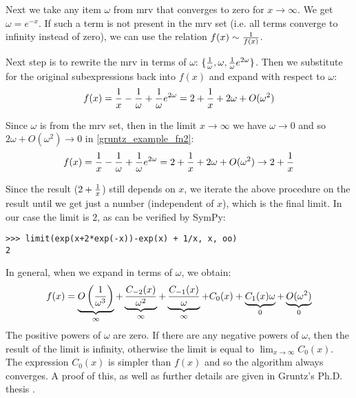 Next we take any item $\omega$ from mrv that converges to zero for
$x\to\infty$.  We get $\omega=e^{-x}$. If such a term is not present in the mrv
set (i.e. all terms converge to infinity instead of zero), we can use the
relation $f(x)\sim {1\over f(x)}$.

Next step is to rewrite the mrv in terms of $\omega$: $\{{1\over\omega},
\omega, {1\over\omega}e^{2\omega}\}$. Then we substitute for the original
subexpressions back into $f(x)$ and expand with respect to $\omega$:
\begin{equation}
    \label{gruntz_example_fn2}
f(x) = {1\over x}-{1\over\omega}+{1\over\omega}e^{2\omega}
     = 2+{1\over x} + 2\omega + O(\omega^2)
\end{equation}

Since $\omega$ is from the mrv set, then in the limit $x\to\infty$ we have
$\omega\to0$ and so $2\omega + O(\omega^2) \to 0$ in
\eqref{gruntz_example_fn2}:
\begin{equation}
f(x) = {1\over x}-{1\over\omega}+{1\over\omega}e^{2\omega}
    = 2+{1\over x} + 2\omega + O(\omega^2)
    \to 2 + {1\over x}
\end{equation}

Since the result ($2+{1\over x}$) still depends on $x$,
we iterate the above procedure on the result until we get just a number
(independent of $x$), which is the final limit. In our case the limit is $2$,
as can be verified by SymPy:

\begin{verbatim}
>>> limit(exp(x+2*exp(-x))-exp(x) + 1/x, x, oo)
2
\end{verbatim}

In general, when we expand in terms of $\omega$, we obtain:
\begin{equation}
f(x) = \underbrace{O\left({1\over \omega^3}\right)}_\infty
    + \underbrace{C_{-2}(x)\over \omega^2}_\infty
    + \underbrace{C_{-1}(x)\over \omega}_\infty
    + {C_{0}(x)}
    + \underbrace{C_{1}(x)\omega}_0
    + \underbrace{O(\omega^2)}_0
\end{equation}
The positive powers of $\omega$ are zero. If there are any negative powers of
$\omega$, then the result of the limit is infinity, otherwise the limit is
equal to $\lim_{x\to\infty} C_0(x)$. The expression $C_0(x)$ is simpler than
$f(x)$ and so the algorithm always converges. A proof of this, as well as
further details are given in Gruntz's Ph.D. thesis \cite{Gruntz1996limits}.

